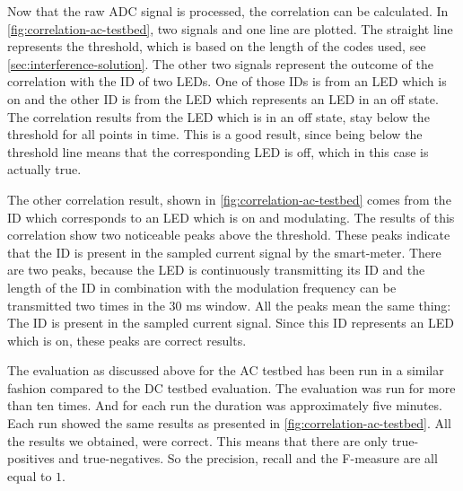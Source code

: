 Now that the raw ADC signal is processed, the correlation can be calculated.
In \autoref{fig:correlation-ac-testbed}, two signals and one line are plotted.
The straight line represents the threshold, which is based on the length of the codes used, see \autoref{sec:interference-solution}.
The other two signals represent the outcome of the correlation with the ID of two LEDs.
One of those IDs is from an LED which is on and the other ID is from the LED which represents an LED in an off state.
The correlation results from the LED which is in an off state, stay below the threshold for all points in time.
This is a good result, since being below the threshold line means that the corresponding LED is off, which in this case is actually true.

The other correlation result, shown in \autoref{fig:correlation-ac-testbed} comes from the ID which corresponds to an LED which is on and modulating.
The results of this correlation show two noticeable peaks above the threshold.
These peaks indicate that the ID is present in the sampled current signal by the smart-meter.
There are two peaks, because the LED is continuously transmitting its ID and the length of the ID in combination with the modulation frequency can be transmitted two times in the 30 ms window.
All the peaks mean the same thing: The ID is present in the sampled current signal.
Since this ID represents an LED which is on, these peaks are correct results.%

The evaluation as discussed above for the AC testbed has been run in a similar fashion compared to the DC testbed evaluation.
The evaluation was run for more than ten times.
And for each run the duration was approximately five minutes.
Each run showed the same results as presented in \autoref{fig:correlation-ac-testbed}.
All the results we obtained, were correct.
This means that there are only true-positives and true-negatives.
So the precision, recall and the F-measure are all equal to $1$.%

